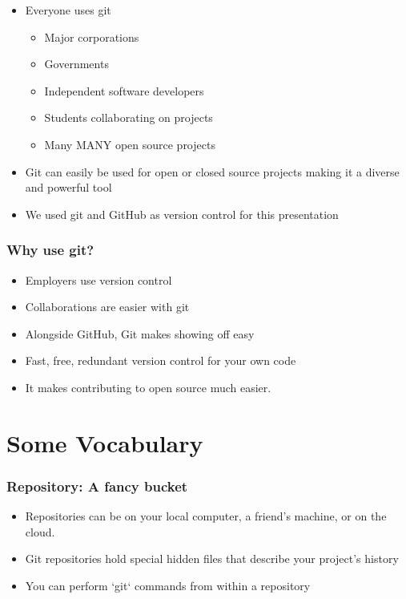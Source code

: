 \documentclass[unknownkeysallowed]{beamer}
\begin{document}
\begin{frame}
\begin{figure}
\begin{center}
                \end{center}
            \endminipage
        \end{figure}
    \begin{itemize}
        \item{Everyone uses git}
            \begin{itemize}
                \item{Major corporations}
                \item{Governments}
                \item{Independent software developers}
                \item{Students collaborating on projects}
                \item{Many MANY open source projects}
           \end{itemize}
        \item{Git can easily be used for open or closed source projects making it a diverse and powerful tool}
        \item{We used git and GitHub as version control for this presentation}
    \end{itemize}
    \vspace{1cm} %
\end{frame}

\begin{frame}
    \frametitle{Why use git?}
    \begin{itemize}
        \item{Employers use version control}
        \item{Collaborations are easier with git}
        \item{Alongside GitHub, Git makes showing off easy}
	\item{Fast, free, redundant version control for your own code}
        \item{It makes contributing to open source much easier.}
    \end{itemize}
    \vspace{1cm} %
\end{frame}

\section{Some Vocabulary}
\begin{frame}
	\frametitle{Repository: A fancy bucket}
        \vspace{1cm} %
	\begin{itemize}
	    \item{Repositories can be on your local computer, a friend's machine, or on the cloud.}
	    \item{Git repositories hold special hidden files that describe your project's history}
	    \item{You can perform `git` commands from within a repository}
	\end{itemize}
\end{frame}
\end{document}
